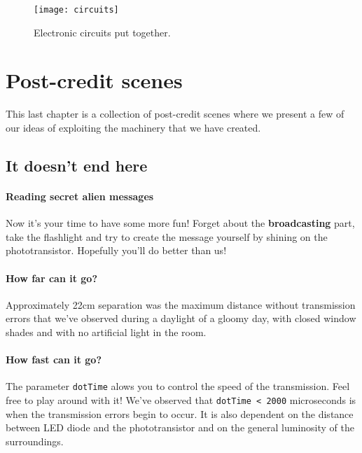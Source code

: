 \documentclass[12pt]{report}
\begin{document}
\begin{figure}[H]
\centering\texttt{[image: circuits]}
\caption{Electronic circuits put together.}				
\label{fig:circuits_pic}
\end{figure}



\chapter{Post-credit scenes}

This last chapter is a collection of post-credit scenes where we present a few of our ideas of exploiting the machinery that we have created.

\section{It doesn't end here}



\subsubsection{Reading secret alien messages}

Now it's your time to have some more fun! Forget about the \textbf{broadcasting} part, take the flashlight and try to create the message yourself by shining on the phototransistor. Hopefully you'll do better than us!


\subsubsection{How far can it go?}

Approximately 22cm separation was the maximum distance without transmission errors that we've observed during a daylight of a gloomy day, with closed window shades and with no artificial light in the room. 


\subsubsection{How fast can it go?}

The parameter \verb|dotTime| alows you to control the speed of the transmission. Feel free to play around with it! We've observed that \verb|dotTime < 2000| microseconds is when the transmission errors begin to occur. It is also dependent on the distance between LED diode and the phototransistor and on the general luminosity of the surroundings.
\end{document}
